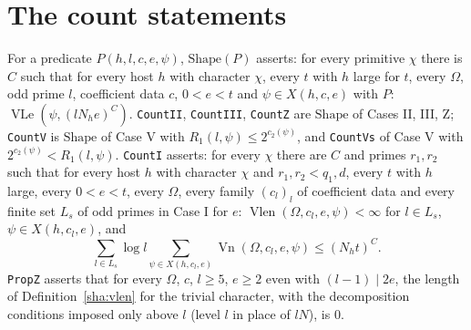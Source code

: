 \section{The count statements}

\begin{definition}\label{sha:counts}
For a predicate $P(h,l,c,e,\psi)$, $\mathrm{Shape}(P)$ asserts: for every primitive $\chi$ there
is $C$ such that for every host $h$ with character $\chi$, every $t$ with $h$ large for $t$,
every $\Omega$, odd prime $l$, coefficient data $c$, $0<e<t$ and $\psi\in X(h,c,e)$ with
$P$: $\operatorname{VLe}(\psi,(lN_he)^C)$.
\texttt{CountII}, \texttt{CountIII}, \texttt{CountZ} are $\mathrm{Shape}$ of Cases II, III, Z;
\texttt{CountV} is $\mathrm{Shape}$ of Case V with $R_1(l,\psi)\le2^{c_2(\psi)}$, and
\texttt{CountVs} of Case V with $2^{c_2(\psi)}<R_1(l,\psi)$.
\texttt{CountI} asserts: for every $\chi$ there are $C$ and primes $r_1,r_2$ such that for
every host $h$ with character $\chi$ and $r_1,r_2<q_1,d$, every $t$ with $h$ large, every
$0<e<t$, every $\Omega$, every family $(c_l)_l$ of coefficient data and every finite set
$L_s$ of odd primes in Case I for $e$: $\operatorname{Vlen}(\Omega,c_l,e,\psi)<\infty$ for
$l\in L_s$, $\psi\in X(h,c_l,e)$, and
\[
\sum_{l\in L_s}\log l\sum_{\psi\in X(h,c_l,e)}\operatorname{Vn}(\Omega,c_l,e,\psi)\le(N_ht)^C .
\]
\texttt{PropZ} asserts that for every $\Omega$, $c$, $l\ge5$, $e\ge2$ even with
$(l-1)\mid2e$, the length of Definition~\ref{sha:vlen} for the trivial character, with the
decomposition conditions imposed only above $l$ (level $l$ in place of $lN$), is $0$.
\end{definition}

